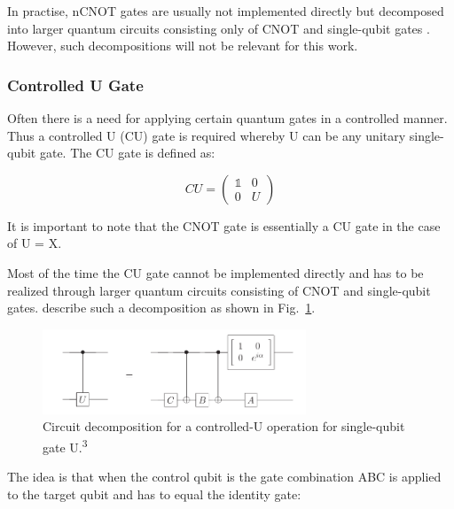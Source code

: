 In practise, nCNOT gates are usually not implemented directly but decomposed into larger quantum circuits consisting only of CNOT and single-qubit gates \cite{nielsen2010quantum}. However, such decompositions will not be relevant for this work.

\subsubsection{Controlled U Gate}
\label{subsubsubsec:controlledugate}

Often there is a need for applying certain quantum gates in a controlled manner. Thus a controlled U (CU) gate is required whereby U can be any unitary single-qubit gate. The CU gate is defined as:

\begin{equation}
CU = \begin{pmatrix}
 \mathbb{1} & 0 \\ 
 0 & U
 \end{pmatrix}
\end{equation}

It is important to note that the CNOT gate is essentially a CU gate in the case of U = X. 

Most of the time the CU gate cannot be implemented directly and has to be realized through larger quantum circuits consisting of CNOT and single-qubit gates. \cite{nielsen2010quantum} describe such a decomposition as shown in Fig.~\ref{img:cudecomposition}.

\begin{figure}[ht]
   \centering
   \includegraphics[width=0.7\textwidth]{img/controlledudecomp.png}
   \caption{Circuit decomposition for a controlled-U operation for single-qubit gate U.\textsuperscript{3}}
   \label{img:cudecomposition}
\end{figure}


The idea is that when the control qubit is \0 the gate combination ABC is applied to the target qubit and has to equal the identity gate:

